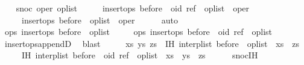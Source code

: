 \begin{isabellebody}
\isanewline
{}\isamarkupfalse%
\isanewline
\ \ \isamarkupfalse%
\ {\isacharparenleft}snoc\ oper\ op{\isacharunderscore}list{\isacharparenright}\isanewline
\ \ \isamarkupfalse%
\ \isamarkupfalse%
\ {\isachardoublequoteopen}insert{\isacharunderscore}ops\ {\isacharparenleft}{\isacharparenleft}before\ {\isacharat}\ {\isacharparenleft}oid{\isacharcomma}\ ref{\isacharparenright}\ {\isacharhash}\ op{\isacharunderscore}list{\isacharparenright}\ {\isacharat}\ {\isacharbrackleft}oper{\isacharbrackright}{\isacharparenright}{\isachardoublequoteclose}\isanewline
\ \ \ \ \ {\isachardoublequoteopen}insert{\isacharunderscore}ops\ {\isacharparenleft}{\isacharparenleft}before\ {\isacharat}\ op{\isacharunderscore}list{\isacharparenright}\ {\isacharat}\ {\isacharbrackleft}oper{\isacharbrackright}{\isacharparenright}{\isachardoublequoteclose}\isanewline
\ \ \ \ \isamarkupfalse%
\ auto\isanewline
\ \ \isamarkupfalse%
\ \isamarkupfalse%
\ ops{}{\isacharcolon}\ {\isachardoublequoteopen}insert{\isacharunderscore}ops\ {\isacharparenleft}before\ {\isacharat}\ op{\isacharunderscore}list{\isacharparenright}{\isachardoublequoteclose}\isanewline
\ \ \ \ \ ops{}{\isacharcolon}\ {\isachardoublequoteopen}insert{\isacharunderscore}ops\ {\isacharparenleft}before\ {\isacharat}\ {\isacharparenleft}oid{\isacharcomma}\ ref{\isacharparenright}\ {\isacharhash}\ op{\isacharunderscore}list{\isacharparenright}{\isachardoublequoteclose}\isanewline
\ \ \ \ \isamarkupfalse%
\ insert{\isacharunderscore}ops{\isacharunderscore}appendD\ \isamarkupfalse%
\ blast{\isacharplus}\isanewline
\ \ \isamarkupfalse%
\ \isamarkupfalse%
\ xs\ ys\ zs\ \ IH{}{\isacharcolon}\ {\isachardoublequoteopen}interp{\isacharunderscore}list\ {\isacharparenleft}before\ {\isacharat}\ op{\isacharunderscore}list{\isacharparenright}\ {\isacharequal}\ xs\ {\isacharat}\ zs{\isachardoublequoteclose}\isanewline
\ \ \ \ \ IH{}{\isacharcolon}\ {\isachardoublequoteopen}interp{\isacharunderscore}list\ {\isacharparenleft}before\ {\isacharat}\ {\isacharparenleft}oid{\isacharcomma}\ ref{\isacharparenright}\ {\isacharhash}\ op{\isacharunderscore}list{\isacharparenright}\ {\isacharequal}\ xs\ {\isacharat}\ ys\ {\isacharat}\ zs{\isachardoublequoteclose}\isanewline
\ \ \ \ \isamarkupfalse%
\ snoc{\isachardot}IH\ \isamarkupfalse%

\end{isabellebody}
